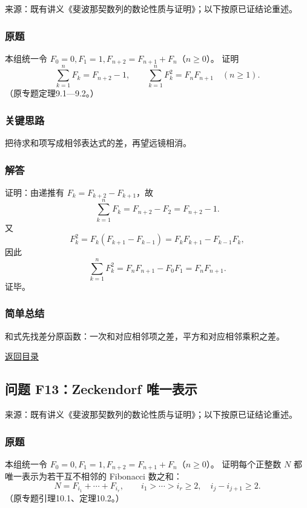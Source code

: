 \documentclass[11pt,a4paper]{article}
\begin{document}
来源：既有讲义《斐波那契数列的数论性质与证明》；以下按原已证结论重述。

\subsubsection{原题}\label{ux539fux9898-44}

本组统一令 \(F_0=0,F_1=1,F_{n+2}=F_{n+1}+F_n\)（\(n\ge0\)）。 证明
\[\sum_{k=1}^nF_k=F_{n+2}-1,\qquad\sum_{k=1}^nF_k^2=F_nF_{n+1}\quad(n\ge1).\]
（原专题定理9.1---9.2。）

\subsubsection{关键思路}\label{ux5173ux952eux601dux8def-44}

把待求和项写成相邻表达式的差，再望远镜相消。

\subsubsection{解答}\label{ux89e3ux7b54-44}

证明：由递推有 \(F_k=F_{k+2}-F_{k+1}\)，故
\[\sum_{k=1}^nF_k=F_{n+2}-F_2=F_{n+2}-1.\] 又
\[F_k^2=F_k(F_{k+1}-F_{k-1})=F_kF_{k+1}-F_{k-1}F_k,\] 因此
\[\sum_{k=1}^nF_k^2=F_nF_{n+1}-F_0F_1=F_nF_{n+1}.\] 证毕。

\subsubsection{简单总结}\label{ux7b80ux5355ux603bux7ed3-44}

和式先找差分原函数：一次和对应相邻项之差，平方和对应相邻乘积之差。

\noindent\hyperref[contents]{返回目录}

\subsection{问题 F13：Zeckendorf
唯一表示}\label{ux95eeux9898-f13zeckendorf-ux552fux4e00ux8868ux793a}

来源：既有讲义《斐波那契数列的数论性质与证明》；以下按原已证结论重述。

\subsubsection{原题}\label{ux539fux9898-45}

本组统一令 \(F_0=0,F_1=1,F_{n+2}=F_{n+1}+F_n\)（\(n\ge0\)）。
证明每个正整数 \(N\) 都唯一表示为若干互不相邻的 Fibonacci 数之和：
\[N=F_{i_1}+\cdots+F_{i_r},\qquad i_1>\cdots>i_r\ge2,\quad i_j-i_{j+1}\ge2.\]
（原专题引理10.1、定理10.2。）
\end{document}
